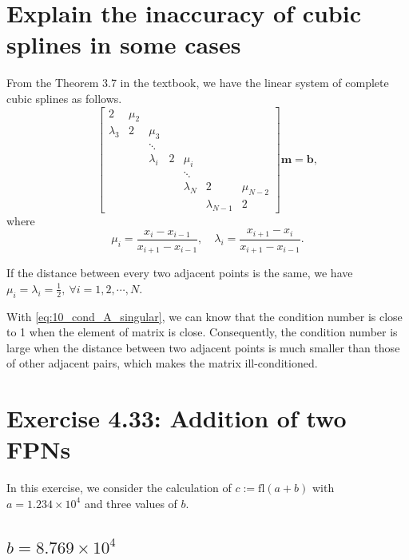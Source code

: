 \documentclass[a4paper]{article}
\begin{document}
\section{Explain the inaccuracy of cubic splines in some cases}

From the Theorem 3.7 in the textbook, we have the linear system of complete cubic splines as follows.
\begin{equation}
    \begin{bmatrix}
        2 & \mu_2 & & & & & \\
        \lambda_3 & 2 & \mu_3 & & & & \\
        & & \ddots & & & & \\
        & & \lambda_i & 2 & \mu_i & & \\
        & & & & \ddots & & \\
        & & & & \lambda_N & 2 & \mu_{N - 2} \\
        & & & & & \lambda_{N - 1} & 2
    \end{bmatrix}
    \mathbf{m} = \mathbf{b},
    \label{eq:14_cubic_spline_system}
\end{equation}
where 
\begin{equation}
    \mu_i = \frac{x_i - x_{i - 1}}{x_{i + 1} - x_{i - 1}},\quad \lambda_i = \frac{x_{i + 1} - x_i}{x_{i + 1} - x_{i - 1}}.
    \label{eq:14_cubic_spline_coefficients}
\end{equation}

If the distance between every two adjacent points is the same, we have $\mu_i = \lambda_i = \frac{1}{2},\ \forall i = 1, 2, \cdots, N$.

With \cref{eq:10_cond_A_singular}, we can know that the condition number is close to 1 when the element of matrix is close. Consequently, the condition number is large when the distance between two adjacent points is much smaller than those of other adjacent pairs, which makes the matrix ill-conditioned.

\section{Exercise 4.33: Addition of two FPNs}

In this exercise, we consider the calculation of $c := \text{fl}(a + b)$ with $a = 1.234 \times 10^4$ and three values of $b$.

\subsection{$b = 8.769 \times 10^4$}
\end{document}
